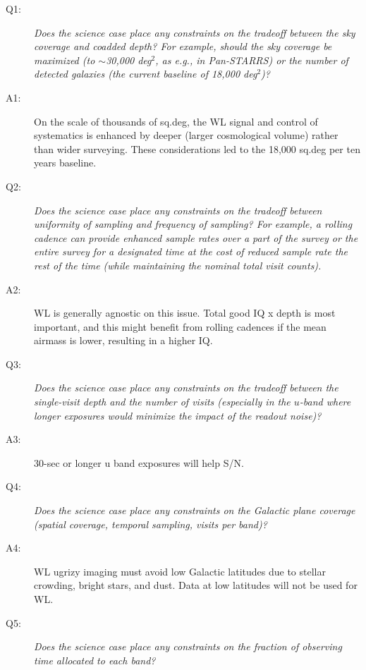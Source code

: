 \begin{description}

\item[Q1:] {\it Does the science case place any constraints on the
tradeoff between the sky coverage and coadded depth? For example, should
the sky coverage be maximized (to $\sim$30,000 deg$^2$, as e.g., in
Pan-STARRS) or the number of detected galaxies (the current baseline
of 18,000 deg$^2$)?}

\item[A1:] On the scale of thousands of sq.deg, the WL signal and
control of systematics is enhanced by deeper (larger cosmological
volume) rather than wider surveying. These considerations led to the
18,000 sq.deg per ten years baseline.

\item[Q2:] {\it Does the science case place any constraints on the
tradeoff between uniformity of sampling and frequency of  sampling? For
example, a rolling cadence can provide enhanced sample rates over a part
of the survey or the entire survey for a designated time at the cost of
reduced sample rate the rest of the time (while maintaining the nominal
total visit counts).}

\item[A2:] WL is generally agnostic on this issue. Total good IQ x depth
is most important, and this might benefit from rolling cadences if the
mean airmass is lower, resulting in a higher IQ.


\item[Q3:] {\it Does the science case place any constraints on the
tradeoff between the single-visit depth and the number of visits
(especially in the $u$-band where longer exposures would minimize the
impact of the readout noise)?}

\item[A3:] 30-sec or longer u band exposures will help S/N.

\item[Q4:] {\it Does the science case place any constraints on the
Galactic plane coverage (spatial coverage, temporal sampling, visits per
band)?}

\item[A4:] WL ugrizy imaging must avoid low Galactic latitudes due to
stellar crowding, bright stars, and dust. Data at low latitudes will not
be used for WL.

\item[Q5:] {\it Does the science case place any constraints on the
fraction of observing time allocated to each band?}


\end{description}
